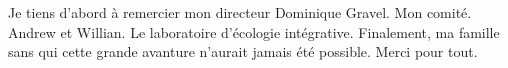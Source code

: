Je tiens d’abord à remercier mon directeur Dominique Gravel. Mon comité. Andrew et Willian. Le laboratoire d'écologie intégrative. Finalement, ma famille sans qui cette grande avanture n'aurait jamais été possible. Merci pour tout.